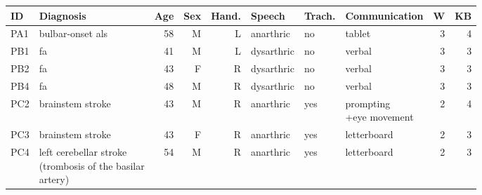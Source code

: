 \sffamily
\small
\begin{tabular}{@{}llrrrlllrr@{}}
  \toprule
  \textbf{ID}  & \textbf{Diagnosis} & \textbf{Age} & \textbf{Sex} & \textbf{Hand.} &
  \textbf{Speech} & \textbf{Trach.} & \textbf{Communication} &
  \textbf{W} & \textbf{KB} \\ \midrule
  PA1 & bulbar-onset \acs{als} & 58  & M   & L     & anarthric  & no          & tablet                 & 3  & 4 \\
  PB1 & \acs{fa} & 41  & M   & L     & dysarthric & no          & verbal                 & 3  & 3 \\
  PB2 & \acs{fa} & 43  & F   & R     & dysarthric & no          & verbal                 & 3  & 3 \\
  PB4 & \acs{fa} & 48  & M   & R     & dysarthric & no          & verbal                 & 3  & 3 \\
  PC2 & brainstem stroke & 43  & M   & R     & anarthric  & yes         &  \makecell[l]{prompting\\+eye movement} & 2 & 4  \\
  PC3 & brainstem stroke & 43  & F   & R     & anarthric  & yes         & letterboard            & 2  & 3 \\
  PC4 & \makecell[l]{left cerebellar stroke \\ (trombosis of the  basilar \\ artery)} & 54  & M   & R     & anarthric  & yes & letterboard & 2 & 3 \\
  \bottomrule
\end{tabular}
